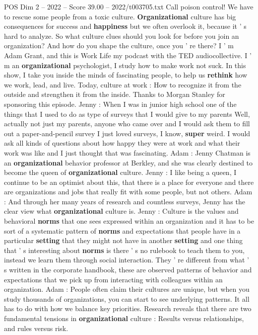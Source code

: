 \begin{textsample}{POS Dim 2 – 2022 – Score 39.00 – 2022/t003705.txt}
Call poison control!
We have to rescue some people from a toxic culture. \textbf{Organizational} culture has big consequences for success and \textbf{happiness} but we often overlook it, because it ' s hard to analyze.
So what culture clues should you look for before you join an organization?
And how do you shape the culture, once you ' re there?
I ' m Adam Grant, and this is Work Life my podcast with the TED audiocollective.
I ' m an \textbf{organizational} psychologist, I study how to make work not suck.
In this show, I take you inside the minds of fascinating people, to help us \textbf{rethink} how we work, lead, and live.
Today, culture at work : How to recognize it from the outside and strengthen it from the inside.
Thanks to Morgan Stanley for sponsoring this episode.
Jenny : When I was in junior high school one of the things that I used to do as type of surveys that I would give to my parents Well, actually not just my parents, anyone who came over and I would ask them to fill out a paper-and-pencil survey I just loved surveys, I know, \textbf{super} weird.
I would ask all kinds of questions about how happy they were at work and what their work was like and I just thought that was fascinating.
Adam : Jenny Chatman is an \textbf{organizational} behavior professor at Berkley, and she was clearly destined to become the queen of \textbf{organizational} culture.
Jenny : I like being a queen, I continue to be an optimist about this, that there is a place for everyone and there are organizations and jobs that really fit with some people, but not others.
Adam : And through her many years of research and countless surveys, Jenny has the clear view what \textbf{organizational} culture is.
Jenny : Culture is the values and behavioral \textbf{norms} that one sees expressed within an organization and it has to be sort of a systematic pattern of \textbf{norms} and expectations that people have in a particular \textbf{setting} that they might not have in another \textbf{setting} and one thing that ' s interesting about \textbf{norms} is there ' s no rulebook to teach them to you, instead we learn them through social interaction.
They ' re different from what ' s written in the corporate handbook, these are observed patterns of behavior and expectations that we pick up from interacting with colleagues within an organization.
Adam : People often claim their cultures are unique, but when you study thousands of organizations, you can start to see underlying patterns.
It all has to do with how we balance key priorities.
Research reveals that there are two fundamental tensions in \textbf{organizational} culture : Results versus relationships, and rules versus risk.

\end{textsample}
